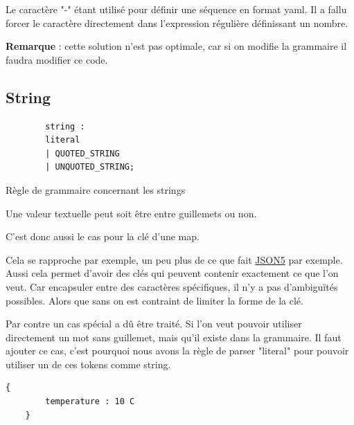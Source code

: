 \documentclass[
    iict, %
    il, %
]{heig-tb}
\begin{document}
Le caractère "-" étant utilisé pour définir une séquence en format yaml.
Il a fallu forcer le caractère directement dans l'expression régulière définissant un nombre.

\textbf{Remarque} : cette solution n'est pas optimale, car si on modifie la grammaire il faudra modifier ce code.

\subsection{String}

\begin{listing}[!ht]
    \begin{verbatim}
        string :
        literal
        | QUOTED_STRING
        | UNQUOTED_STRING;
    \end{verbatim}
    \caption{Règle de grammaire concernant les strings}
    \label{string-rule}
\end{listing}

Une valeur textuelle peut soit être entre guillemets ou non.

C'est donc aussi le cas pour la clé d'une map.

Cela se rapproche par exemple, un peu plus de ce que fait \href{https://json5.org/}{JSON5} par exemple.
Aussi cela permet d'avoir des clés qui peuvent contenir exactement ce que l'on veut.
Car encapsuler entre des caractères spécifiques, il n'y a pas d'ambiguïtés possibles. Alors que sans on est contraint de limiter la forme de la clé.

Par contre un cas spécial a dû être traité. Si l'on veut pouvoir utiliser directement un mot sans guillemet, mais qu'il existe dans la grammaire.
Il faut ajouter ce cas, c'est pourquoi nous avons la règle de parser "literal" pour pouvoir utiliser un de ces tokens comme string.

\begin{lstlisting}[frame=single]
    {
        temperature : 10 C
    }
\end{lstlisting}
\end{document}
